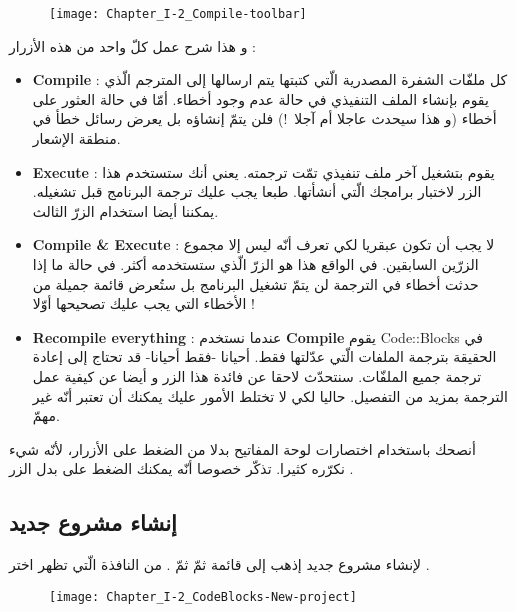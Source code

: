 \begin{figure}[H]
	\centering
	\texttt{[image: Chapter\_I-2\_Compile-toolbar]}
\end{figure}

و هذا شرح عمل كلّ واحد من هذه الأزرار :

\begin{itemize}
  \item \textbf{\textenglish{Compile}} :
كل ملفّات الشفرة المصدرية الّتي كتبتها يتم ارسالها إلى المترجم الّذي يقوم بإنشاء الملف التنفيذي في حالة عدم وجود أخطاء. أمّا في حالة العثور على أخطاء (و هذا سيحدث عاجلا أم آجلا~!) فلن يتمّ إنشاؤه بل يعرض رسائل خطأ في منطقة الإشعار.
  \item \textbf{\textenglish{Execute}} :
يقوم بتشغيل آخر ملف تنفيذي تمّت ترجمته. يعني أنك ستستخدم هذا الزر لاختبار برامجك الّتي أنشأتها. طبعا يجب عليك ترجمة البرنامج قبل تشغيله. يمكننا أيضا استخدام الزرّ الثالث.
  \item \textbf{\textenglish{Compile \& Execute}} :
لا يجب أن تكون عبقريا لكي تعرف أنّه ليس إلا مجموع الزرّين السابقين. في الواقع هذا هو الزرّ الّذي ستستخدمه أكثر. في حالة ما إذا حدثت أخطاء في الترجمة لن يتمّ تشغيل البرنامج بل ستُعرض قائمة جميلة من الأخطاء التي يجب عليك تصحيحها أوّلا !
  \item \textbf{\textenglish{Recompile everything}} :
 عندما نستخدم
\textbf{\textenglish{Compile}}
يقوم
\textenglish{Code::Blocks}
في الحقيقة بترجمة الملفات الّتي عدّلتها فقط. أحيانا -فقط أحيانا- قد تحتاج إلى إعادة ترجمة جميع الملفّات. سنتحدّث لاحقا عن فائدة هذا الزر و أيضا عن كيفية عمل الترجمة بمزيد من التفصيل. حاليا لكي لا تختلط الأمور عليك يمكنك أن تعتبر أنّه غير مهمّ.
\end{itemize}

\begin{information}
أنصحك باستخدام اختصارات لوحة المفاتيح بدلا من الضغط على الأزرار، لأنّه شيء نكرّره كثيرا. تذكّر خصوصا أنّه يمكنك الضغط على
بدل الزر
.
\end{information}

\subsection{إنشاء مشروع جديد}

لإنشاء مشروع جديد إذهب إلى قائمة
ثمّ
ثمّ
.
من النافذة الّتي تظهر اختر
.

\begin{figure}[H]
	\centering
	\texttt{[image: Chapter\_I-2\_CodeBlocks-New-project]}
\end{figure}

